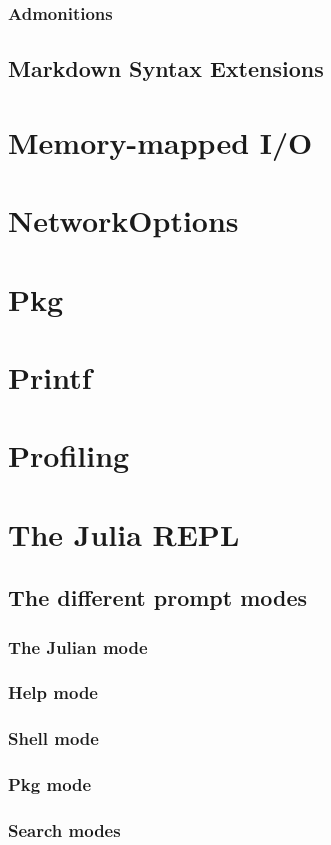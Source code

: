     \subsection{Admonitions}
    \section{Markdown Syntax Extensions}
  \chapter{Memory-mapped I/O}
  \chapter{NetworkOptions}
  \chapter{Pkg}
  \chapter{Printf}
  \chapter{Profiling}
  \chapter{The Julia REPL}
    \section{The different prompt modes}
    \subsection{The Julian mode}
    \subsection{Help mode}
    \subsection{Shell mode}
    \subsection{Pkg mode}
    \subsection{Search modes}
